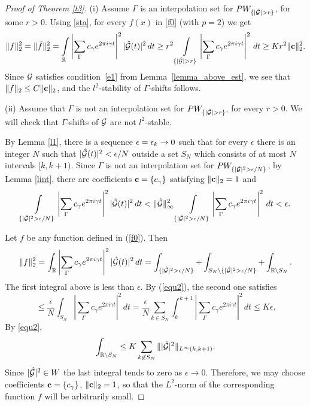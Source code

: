 \documentclass[12pt]{amsart}
\numberwithin{equation}{section}
\newcommand{\R}{{\mathbb R}} \newcommand{\Q}{{\mathbb Q}} \newcommand{\Z}{{\mathbb Z}} \newcommand{\N}{{\mathbb N}}
\begin{document}
    \begin{proof}[Proof of Theorem \ref{t3}]
        (i) Assume $\Gamma$ is  an interpolation set for $PW_{\{|\hat\Ff|>r\}}$, for some $ r>0.$ 
       Using \eqref{sta},  for every           $f(x)$ in \eqref{f0}  (with $p=2$)  we get
$$\|f\|_2^2=\|\hat f\|_2^2=\int\limits_{\R}\left|\sum_\Gamma c_\gamma e^{2\pi i \gamma t}\right|^2|\hat\Ff(t)|^2\,dt\geq r^2\int\limits_{\{|\hat\Ff|> r\}}\left|\sum_\Gamma c_\gamma e^{2\pi i \gamma t}\right|^2\,dt\geq K r^2 \|\cc\|_{2}^2.$$
Since $\mathcal{G}$ satisfies condition~\eqref{e1} from Lemma~\ref{lemma_above_est}, we see that $\|f\|_2 \le C \|{\bf c}\|_2$, and the $l^2$-stability of $\Gamma$-shifts follows. 

(ii)  
Assume that $\Gamma$ is not an interpolation set for $PW_{\{|\hat\Ff|>r\}},$ for every $r>0$. We will check that $\Gamma$-shifts of $\mathcal{G}$ are not $l^2$-stable. 

By Lemma \ref{l1},
there is a sequence  ${\bf \epsilon}=\epsilon_k\to 0$  such that for every $\epsilon$ there is an integer $N$ such that $|\hat{\mathcal{G}}(t)|^2<\epsilon/N$ outside  a set $S_N$ which consists of  at most $ N$ intervals $[k,k+1)$. Since $\Gamma$ is not an interpolation set  for $PW_{\{|\hat{\mathcal{G}}|^2>\epsilon/N\}}$, by Lemma \ref{lint}, there are coefficients ${\bf c}=\{c_\gamma\}$ satisfying $\|{\bf c}\|_{2}=1$ and 
$$\int\limits_{\{|\hat{\mathcal{G}}|^2>\epsilon/N\}}\left|\sum_\Gamma c_\gamma e^{2\pi i \gamma t}\right|^2|\hat{\mathcal{G}}(t)|^2\,dt<\|\hat{\mathcal{G}}\|_\infty^2\int\limits_{\{|\hat{\mathcal{G}}|^2>\epsilon/N\}}\left|\sum_\Gamma c_\gamma e^{2\pi i \gamma t}\right|^2\,dt<\epsilon.$$

Let  $f$ be any function defined in (\ref{f0}). Then
$$\|f\|_2^2=\int_\R \left|\sum_\Gamma c_\gamma e^{2\pi i \gamma t}\right|^2|\hat\Ff(t)|^2\,dt=\int_{\{|\hat\Ff|^2>\epsilon/N\}}+\int_{S_N\setminus \{|\hat\Ff|^2>\epsilon/N\}}+\int_{\R\setminus S_N}.$$ The first integral above is less than $\epsilon.$ By (\ref{equ2}), the second one satisfies
$$\leq \frac{\epsilon}{N}\int_{S_N}\left|\sum_\Gamma c_\gamma e^{2\pi i \gamma t}\right|^2\,dt=\frac{\epsilon}{N}\sum_{k\in S_N}\int_{k}^{k+1}\left|\sum_\Gamma c_\gamma e^{2\pi i \gamma t}\right|^2\,dt\leq K\epsilon.$$  By \eqref{equ2}, 
$$\int_{\R\setminus S_N}\leq K \sum_{k\not\in S_N}\||\hat\Ff|^2\|_{L^{\infty}(k,k+1)}.$$
Since $|\hat{\mathcal{G}}|^2\in W$
the last integral tends to zero as $\epsilon\to0.$       Therefore, we may choose coefficients ${\bf c}=\{c_\gamma\}$,
 $\|{\bf c}\|_2=1$, so that the $L^2$-norm of the corresponding function $f$ will be arbitrarily small.
\end{proof}
\end{document}
